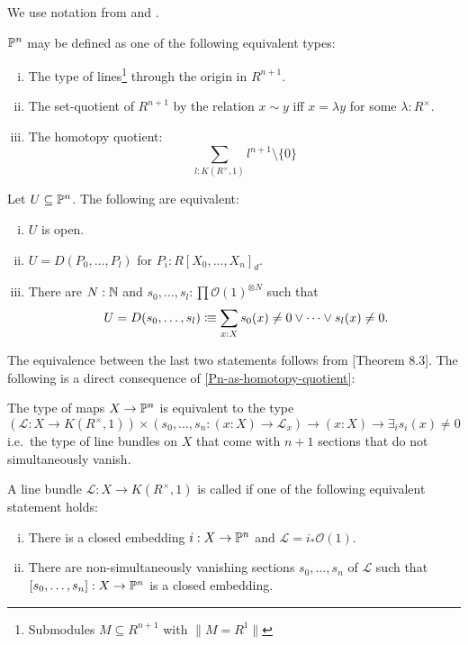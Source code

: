 
We use notation from \cite{draft} and \cite{sag-projective}.

\begin{definition}
  \label{Pn-definitions}
  $\mathbb{P}^n$ may be defined as one of the following equivalent types:
  \begin{enumerate}[(i)]
  \item The type of lines\footnote{Submodules $M\subseteq R^{n+1}$ with $\| M=R^1 \|$} through the origin in $R^{n+1}$.
  \item The set-quotient of $R^{n+1}$ by the relation $x\sim y$ iff $x=\lambda y$ for some $\lambda :R^\times$.
  \item\label{Pn-as-homotopy-quotient} The homotopy quotient:
    \[
      \sum_{l : K(R^\times,1)} l^{n+1}\setminus\{0\}
    \]
  \end{enumerate}
\end{definition}

\begin{lemma}
  \label{D-for-Pn}
  Let $U\subseteq \mathbb{P}^n$.
  The following are equivalent:
  \begin{enumerate}[(i)]
  \item $U$ is open.
  \item $U=D(P_0,\dots,P_l)$ for $P_i:R[X_0,\dots,X_n]_d$.
  \item There are $N:\mathbb{N}$ and $s_0,\dots,s_l:\prod \mathcal O(1)^{\otimes N}$ such that
    \[
      U=D(s_0,\dots,s_l)\colonequiv\sum_{x:X}s_0(x)\neq 0\vee \dots \vee s_l(x)\neq 0
      \rlap{.}
    \]
  \end{enumerate}
\end{lemma}

The equivalence between the last two statements follows from \cite{cech-draft}[Theorem 8.3].
The following is a direct consequence of  \ref{Pn-as-homotopy-quotient}:

\begin{remark}
  The type of maps $X\to \mathbb{P}^n$ is equivalent to the type
  \[
  (\mathcal L:X\to K(R^\times,1))\times (s_0,\dots,s_n:(x:X)\to \mathcal L_x) \to (x:X) \to \exists_{i} s_i(x)\neq 0
  \]
  i.e.\ the type of line bundles on $X$ that come with $n+1$ sections that do not simultaneously vanish.
\end{remark}

\begin{definition}
  A line bundle $\mathcal L:X\to K(R^\times,1)$ is called 
  if one of the following equivalent statement holds:
  \begin{enumerate}[(i)]
  \item There is a closed embedding $i:X\to \mathbb{P}^n$ and $\mathcal L=i_\ast \mathcal O(1)$.
  \item There are non-simultaneously vanishing sections $s_0,\dots,s_n$ of $\mathcal L$
    such that $[s_0,\dots,s_n]:X\to \mathbb{P}^n$ is a closed embedding.
  \end{enumerate}
\end{definition}

